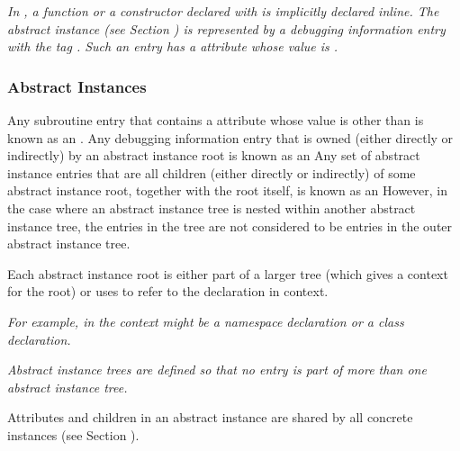 \textit{In , a function or a constructor declared with
 is implicitly declared inline. The abstract
instance (see Section ) 
is represented by a debugging information
entry with the tag \DWTAGsubprogram. Such an entry has a
\DWATinline{} attribute whose value is \DWINLinlined.}

\subsubsection{Abstract Instances}
\label{chap:abstractinstances}
Any subroutine entry that contains a
\DWATinlineDEFN{} attribute 
whose value is other than 
\DWINLnotinlined{}
is known as an .
\hypertarget{chap:DWATinlineabstracttinstance}{}
Any debugging information entry that is owned (either
directly or indirectly) by an abstract instance root
is known as an 
Any set of abstract instance entries that are all
children (either directly or indirectly) of some abstract
instance root, together with the root itself, is known as an
However, in the case where an abstract instance tree is 
nested within another abstract instance tree, the entries in the 
tree are not considered to be entries in the outer abstract
instance tree.

Each abstract instance root is either part of a larger
tree (which gives a context for the root) or 
uses
\DWATspecification{} 
to refer to the declaration in context.

\textit{For example, in  the context might be a namespace
declaration or a class declaration.}

\textit{Abstract instance trees are defined so that no entry is part
of more than one abstract instance tree.}

Attributes and children in an abstract instance are shared
by all concrete instances (see Section ).

